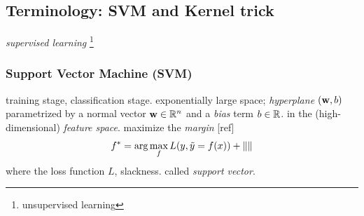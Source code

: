 \subsection{Terminology: SVM and Kernel trick}\label{sec:svm}
\emph{supervised learning} 
\footnote{unsupervised learning}

\subsubsection{Support Vector Machine (SVM)}
training stage, classification stage.
exponentially large space;
\emph{hyperplane} $(\vb{w},b)$ parametrized by a normal vector $\vb{w}\in\mathbb{R}^n$ and a \emph{bias} term $b\in\mathbb{R}$. in the (high-dimensional) \emph{feature space}.
maximize the \emph{margin} [ref]
\begin{equation}
	f^* = \arg \max_f  L(y,\tilde{y}=f(x)) + \norm{}
\end{equation}
where the loss function $L$, slackness. called \emph{support vector}.

